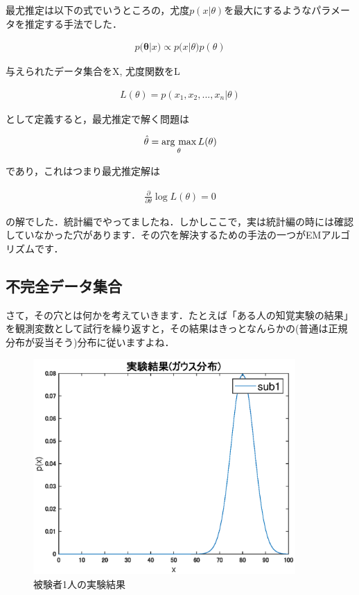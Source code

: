 \documentclass[11pt,a4paper]{ujreport}
\newcommand{\argmax}{\mathop{\rm arg~max}\limits}
\begin{document}
最尤推定は以下の式でいうところの，尤度$p(x|\theta)$を最大にするようなパラメータを推定する手法でした．

\begin{align}
  p(\mathbf{\theta}|x) \propto p(x|{\theta)p(\theta)}
\end{align}

与えられたデータ集合をX, 尤度関数をL

\begin{align}
  L(\theta) = p(x_1, x_2, ... , x_n | \theta)
\end{align}
  
として定義すると，最尤推定で解く問題は

\begin{align}
  \hat{\theta} = \argmax_\theta L(\theta)
\end{align}

であり，これはつまり最尤推定解は

\begin{align}
  \frac{\partial}{\partial \theta}\log L(\theta) = 0
  \label{eq:ml}
\end{align}

の解でした．統計編でやってましたね．しかしここで，実は統計編の時には確認していなかった穴があります．その穴を解決するための手法の一つがEMアルゴリズムです．\\

\subsection{不完全データ集合}
さて，その穴とは何かを考えていきます．たとえば「ある人の知覚実験の結果」を観測変数として試行を繰り返すと，その結果はきっとなんらかの(普通は正規分布が妥当そう)分布に従いますよね．

\begin{figure}[H]
  \centering
  \label{im:gauss-test1}
  \includegraphics[width=10cm]{../figures/test1.eps}
  \caption{被験者1人の実験結果}
\end{figure}
\end{document}
